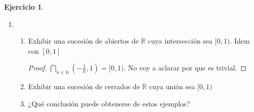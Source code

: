\documentclass[11pt]{report}
\newcommand{\R}{\mathbb{R}}
\newcommand{\N}{\mathbb{N}}
\theoremstyle{definition}
\newtheorem{ej}{Ejercicio}
\begin{document}
\begin{ej}
\begin{enumerate}
\begin{proof}
El absurdo provino de suponer que $y \in X \setminus G$ por lo tanto $y \in G$
\end{proof}
  \item 
    \begin{enumerate}
      \item Exhibir una sucesión de abiertos de $\R$ cuya intersección sea $[0,1)$. Idem con $[0,1]$
	      \begin{proof}
		      $\bigcap_{n\in \N} (- \frac{1}{n} , 1) = [0,1)$. No voy a aclarar por que es trivial.
	      \end{proof}
	      
	      
      \item Exhibir una sucesión de cerrados de $\R$ cuya unión sea $[0,1)$
      \item ¿Qué conclusión puede obtenerse de estos ejemplos? 
    \end{enumerate}
\end{enumerate}
\end{ej}
\end{document}

